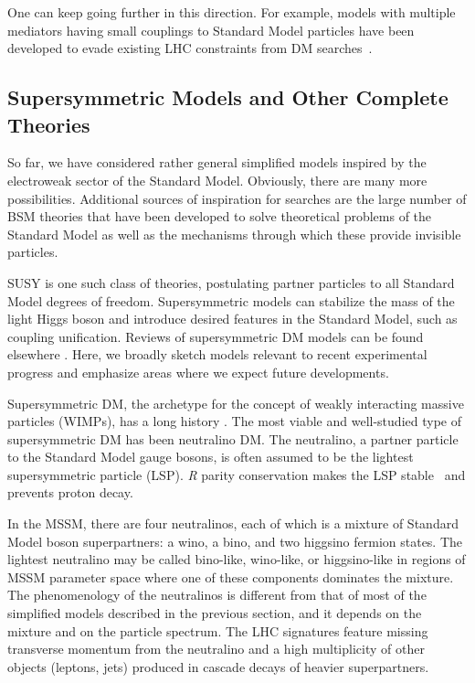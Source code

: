 \documentclass{ar-1col}
\newcommand{\IP}{invisible particle}
\begin{document}
{One can keep going further in this direction. For example, 
{models with multiple mediators} having small couplings
to Standard Model particles have been developed to evade existing LHC
constraints from DM searches~\cite{Duerr:2016tmh}. 

\subsection{Supersymmetric Models and Other Complete Theories}\label{sec:SUSYModels}

So far, we have considered rather general simplified models
inspired by the electroweak sector of the Standard Model.  
Obviously, there are many more possibilities. Additional sources of inspiration for
searches are the large number of BSM theories that have been
developed to solve theoretical problems of the Standard Model as well as the
mechanisms through which these provide {\IP}s.

SUSY is one such class of theories, postulating
partner particles to all Standard Model degrees of freedom. Supersymmetric models 
can stabilize the mass of the light Higgs boson and introduce desired features
in the Standard Model, such as coupling unification. 
Reviews of supersymmetric DM models
can be found elsewhere \cite{Feng:2010gw}. Here, we broadly
sketch models relevant to recent experimental progress and emphasize areas
where we expect future developments.

Supersymmetric DM, the archetype for the concept of weakly interacting massive particles (WIMPs),
has a long history \cite{1984NuPhB.238..453E}. The most
viable and well-studied type of supersymmetric DM has been neutralino DM. The
neutralino, a partner particle to the Standard Model gauge bosons, is
often assumed to be the lightest supersymmetric particle (LSP).
\textit{R} parity conservation makes the LSP stable~\cite{Farrar:1978xj}
and prevents proton decay.

In the MSSM, there are four neutralinos, each of which is a mixture of Standard Model boson
superpartners: a wino, a bino, and two higgsino fermion states.
The lightest neutralino may be called bino-like, wino-like, or
higgsino-like in regions of MSSM parameter space where one of
these components dominates the mixture. 
The phenomenology of the neutralinos is different from that of most of the simplified models described in the previous
section, and it depends on the mixture and on the particle spectrum.
The LHC signatures feature missing transverse momentum from the
neutralino and a high multiplicity of other objects (leptons,
jets) produced in cascade decays of heavier superpartners.

}
\end{document}
